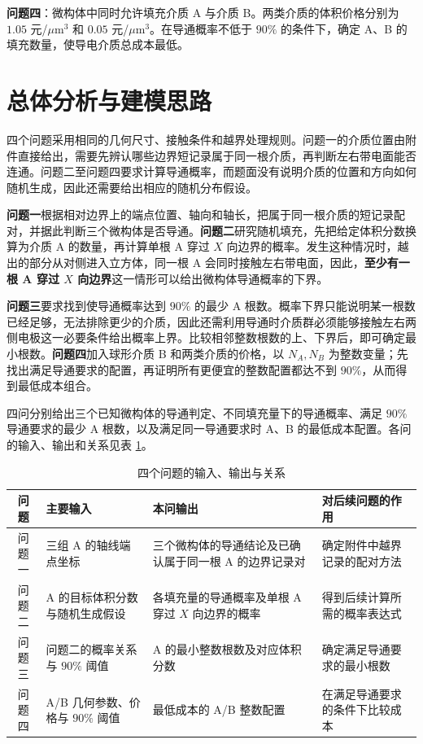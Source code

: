 \documentclass[withoutpreface,bwprint]{cumcmthesis}
\begin{document}
\textbf{问题四}：微构体中同时允许填充介质 A 与介质 B。两类介质的体积价格分别为 $1.05$ 元/$\mu\mathrm{m}^3$ 和 $0.05$ 元/$\mu\mathrm{m}^3$。在导通概率不低于 $90\%$ 的条件下，确定 A、B 的填充数量，使导电介质总成本最低。

\section{总体分析与建模思路}

四个问题采用相同的几何尺寸、接触条件和越界处理规则。问题一的介质位置由附件直接给出，需要先辨认哪些边界短记录属于同一根介质，再判断左右带电面能否连通。问题二至问题四要求计算导通概率，而题面没有说明介质的位置和方向如何随机生成，因此还需要给出相应的随机分布假设。

\textbf{问题一}根据相对边界上的端点位置、轴向和轴长，把属于同一根介质的短记录配对，并据此判断三个微构体是否导通。\textbf{问题二}研究随机填充，先把给定体积分数换算为介质 A 的数量，再计算单根 A 穿过 $X$ 向边界的概率。发生这种情况时，越出的部分从对侧进入立方体，同一根 A 会同时接触左右带电面，因此，\textbf{至少有一根 A 穿过 $X$ 向边界}这一情形可以给出微构体导通概率的下界。

\textbf{问题三}要求找到使导通概率达到 $90\%$ 的最少 A 根数。概率下界只能说明某一根数已经足够，无法排除更少的介质，因此还需利用导通时介质群必须能够接触左右两侧电极这一必要条件给出概率上界。比较相邻整数根数的上、下界后，即可确定最小根数。\textbf{问题四}加入球形介质 B 和两类介质的价格，以 $N_A,N_B$ 为整数变量；先找出满足导通要求的配置，再证明所有更便宜的整数配置都达不到 $90\%$，从而得到最低成本组合。

四问分别给出三个已知微构体的导通判定、不同填充量下的导通概率、满足 $90\%$ 导通要求的最少 A 根数，以及满足同一导通要求时 A、B 的最低成本配置。各问的输入、输出和关系见表 \ref{tab:overall-relation}。

\begin{table}[H]
\centering
\caption{四个问题的输入、输出与关系}
\label{tab:overall-relation}
\small
\begin{tabularx}{0.96\textwidth}{c>{\raggedright\arraybackslash}X>{\raggedright\arraybackslash}X>{\raggedright\arraybackslash}X}
\toprule
问题 & 主要输入 & 本问输出 & 对后续问题的作用 \\
\midrule
问题一 & 三组 A 的轴线端点坐标 & 三个微构体的导通结论及已确认属于同一根 A 的边界记录对 & 确定附件中越界记录的配对方法 \\
问题二 & A 的目标体积分数与随机生成假设 & 各填充量的导通概率及单根 A 穿过 $X$ 向边界的概率 & 得到后续计算所需的概率表达式 \\
问题三 & 问题二的概率关系与 $90\%$ 阈值 & A 的最小整数根数及对应体积分数 & 确定满足导通要求的最小根数 \\
问题四 & A/B 几何参数、价格与 $90\%$ 阈值 & 最低成本的 A/B 整数配置 & 在满足导通要求的条件下比较成本 \\
\bottomrule
\end{tabularx}
\end{table}
\end{document}
